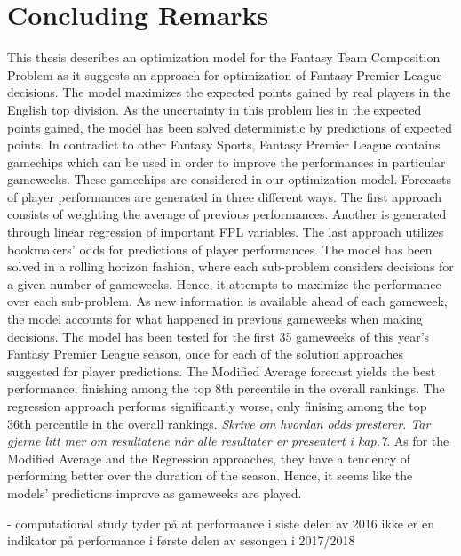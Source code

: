 \chapter{Concluding Remarks}

This thesis describes an optimization model for the Fantasy Team Composition Problem as it suggests an approach for optimization of Fantasy Premier League decisions. The model maximizes the expected points gained by real players in the English top division. As the uncertainty in this problem lies in the expected points gained, the model has been solved deterministic by predictions of expected points. In contradict to other Fantasy Sports, Fantasy Premier League contains gamechips which can be used in order to improve the performances in particular gameweeks. These gamechips are considered in our optimization model. Forecasts of player performances are generated in three different ways. The first approach consists of weighting the average of previous performances. Another is generated through linear regression of important FPL variables. The last approach utilizes bookmakers' odds for predictions of player performances. 
\newpar
The model has been solved in a rolling horizon fashion, where each sub-problem considers decisions for a given number of gameweeks. Hence, it attempts to maximize the performance over each sub-problem. As new information is available ahead of each gameweek, the model accounts for what happened in previous gameweeks when making decisions. 
\newpar
The model has been tested for the first 35 gameweeks of this year's Fantasy Premier League season, once for each of the solution approaches suggested for player predictions. The Modified Average forecast yields the best performance, finishing among the top 8th percentile in the overall rankings. The regression approach performs significantly worse, only finising among the top 36th percentile in the overall rankings. \textit{Skrive om hvordan odds presterer. Tar gjerne litt mer om resultatene når alle resultater er presentert i kap.7}. As for the Modified Average and the Regression approaches, they have a tendency of performing better over the duration of the season. Hence, it seems like the models' predictions improve as gameweeks are played. 

- computational study tyder på at performance i siste delen av 2016 ikke er en indikator på performance i første delen av sesongen i 2017/2018